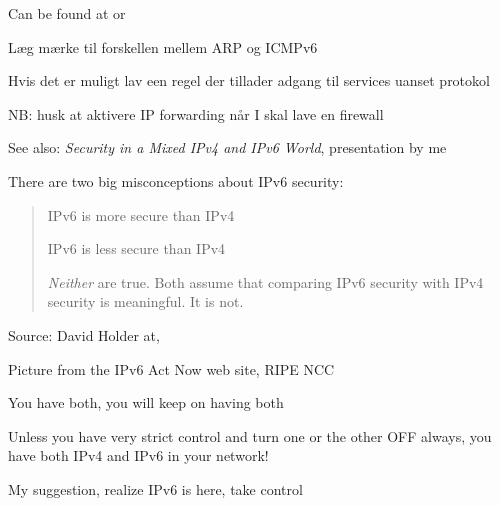 \documentclass[Screen16to9,17pt]{foils}
\begin{document}
{\small Can be found at  or \\
}



\begin{list1}
\item Læg mærke til forskellen mellem ARP og ICMPv6
\item Hvis det er muligt lav een regel der tillader adgang til services uanset protokol
\item NB: husk at aktivere IP forwarding når I skal lave en firewall
\end{list1}

See also:
\emph{Security in a Mixed IPv4 and IPv6 World}, presentation by me\\




There are two big misconceptions about IPv6 security:

\begin{quote}
\begin{list2}
\item IPv6 is more secure than IPv4
\item IPv6 is less secure than IPv4
\end{list2}

\emph{Neither} are true. Both assume that comparing IPv6 security with IPv4 security is meaningful. It is not.
\end{quote}
Source: David Holder at, 



Picture from the IPv6 Act Now web site, RIPE NCC

\begin{list2}
\item You have both, you will keep on having both
\item Unless you have very strict control and turn one or the other OFF always, you have both IPv4 and IPv6 in your network!
\item My suggestion, realize IPv6 is here, take control
\end{list2}
\end{document}
